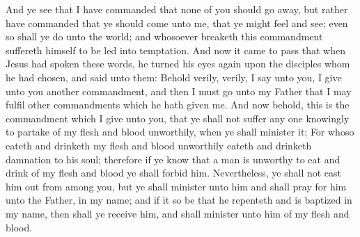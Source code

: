 \bverse \iffalse And ye see that I have commanded that none of you should go away, but rather have commanded that ye should come unto me, that ye might feel and see; even so shall ye do unto the world; and whosoever breaketh this commandment suffereth himself to be led into temptation. \fi
And ye see that I have commanded that none of you should go away, but rather have commanded that ye should come unto me, that ye might feel and see; even so shall ye do unto the world; and whosoever breaketh this commandment suffereth himself to be led into temptation.
\bverse \iffalse And now it came to pass that when Jesus had spoken these words, he turned his eyes again upon the disciples whom he had chosen, and said unto them: \fi
And now it came to pass that when Jesus had spoken these words, he turned his eyes again upon the disciples whom he had chosen, and said unto them:
\bverse \iffalse Behold verily, verily, I say unto you, I give unto you another commandment, and then I must go unto my Father that I may fulfil other commandments which he hath given me. \fi
Behold verily, verily, I say unto you, I give unto you another commandment, and then I must go unto my Father that I may fulfil other commandments which he hath given me.
\bverse \iffalse And now behold, this is the commandment which I give unto you, that ye shall not suffer any one knowingly to partake of my flesh and blood unworthily, when ye shall minister it; \fi
And now behold, this is the commandment which I give unto you, that ye shall not suffer any one knowingly to partake of my flesh and blood unworthily, when ye shall minister it;
\bverse \iffalse For whoso eateth and drinketh my flesh and blood unworthily eateth and drinketh damnation to his soul; therefore if ye know that a man is unworthy to eat and drink of my flesh and blood ye shall forbid him. \fi
For whoso eateth and drinketh my flesh and blood unworthily eateth and drinketh damnation to his soul; therefore if ye know that a man is unworthy to eat and drink of my flesh and blood ye shall forbid him.
\bverse \iffalse Nevertheless, ye shall not cast him out from among you, but ye shall minister unto him and shall pray for him unto the Father, in my name; and if it so be that he repenteth and is baptized in my name, then shall ye receive him, and shall minister unto him of my flesh and blood. \fi
Nevertheless, ye shall not cast him out from among you, but ye shall minister unto him and shall pray for him unto the Father, in my name; and if it so be that he repenteth and is baptized in my name, then shall ye receive him, and shall minister unto him of my flesh and blood.
